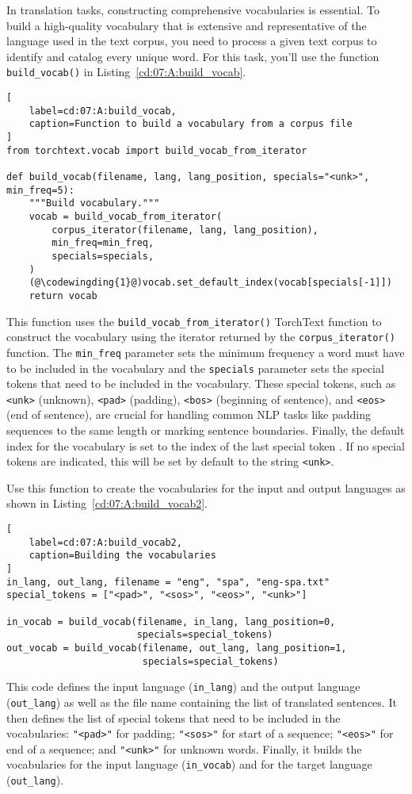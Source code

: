In translation tasks, constructing comprehensive vocabularies is essential. To build a high-quality vocabulary that is extensive and representative of the language used in the text corpus, you need to process a given text corpus to identify and catalog every unique word. 
For this task, you'll use the function \lstinline{build_vocab()} in Listing~\ref{cd:07:A:build_vocab}.
\begin{lstlisting}[
    label=cd:07:A:build_vocab,
    caption=Function to build a vocabulary from a corpus file
]
from torchtext.vocab import build_vocab_from_iterator

def build_vocab(filename, lang, lang_position, specials="<unk>", min_freq=5):
    """Build vocabulary."""
    vocab = build_vocab_from_iterator(
        corpus_iterator(filename, lang, lang_position),
        min_freq=min_freq,
        specials=specials,
    )
    (@\codewingding{1}@)vocab.set_default_index(vocab[specials[-1]])
    return vocab
\end{lstlisting}
This function uses the \lstinline{build_vocab_from_iterator()} TorchText function to construct the vocabulary using the iterator returned by the \lstinline{corpus_iterator()} function. The \lstinline{min_freq} parameter sets the minimum frequency a word must have to be included in the vocabulary and the \lstinline{specials} parameter sets the special tokens that need to be included in the vocabulary. These special tokens, such as \lstinline{<unk>} (unknown), \lstinline{<pad>} (padding), \lstinline{<bos>} (beginning of sentence), and \lstinline{<eos>} (end of sentence), are crucial for handling common NLP tasks like padding sequences to the same length or marking sentence boundaries. 
Finally, the default index for the vocabulary is set to the index of the last special token . If no special tokens are indicated, this will be set by default to the string \lstinline{<unk>}.

Use this function to create the vocabularies for the input and output languages as shown in Listing~\ref{cd:07:A:build_vocab2}.
\begin{lstlisting}[
    label=cd:07:A:build_vocab2,
    caption=Building the vocabularies
]
in_lang, out_lang, filename = "eng", "spa", "eng-spa.txt"
special_tokens = ["<pad>", "<sos>", "<eos>", "<unk>"]

in_vocab = build_vocab(filename, in_lang, lang_position=0, 
                       specials=special_tokens)
out_vocab = build_vocab(filename, out_lang, lang_position=1, 
                        specials=special_tokens)
\end{lstlisting}
This code defines the input language (\lstinline{in_lang}) and the output language (\lstinline{out_lang}) as well as the file name containing the list of translated sentences.
It then defines the list of special tokens that need to be included in the vocabularies: \lstinline{"<pad>"} for padding; \lstinline{"<sos>"} for start of a sequence; \lstinline{"<eos>"} for end of a sequence; and \lstinline{"<unk>"} for unknown words. 
Finally, it builds the vocabularies for the input language (\lstinline{in_vocab}) and for the target language (\lstinline{out_lang}).

